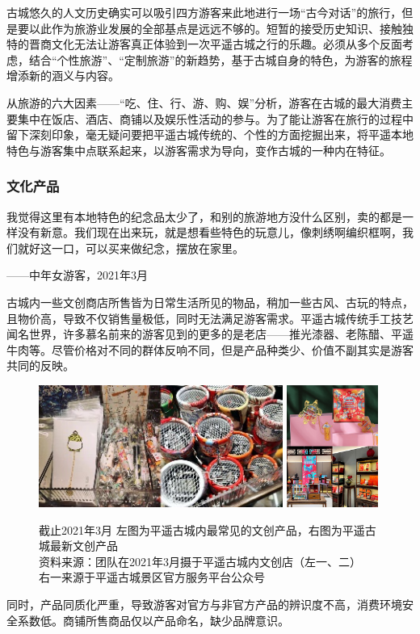 \documentclass[UTF8]{ctexart}
\begin{document}
        古城悠久的人文历史确实可以吸引四方游客来此地进行一场“古今对话”的旅行，但是要以此作为旅游业发展的全部基点是远远不够的。短暂的接受历史知识、接触独特的晋商文化无法让游客真正体验到一次平遥古城之行的乐趣。必须从多个反面考虑，结合“个性旅游”、“定制旅游”的新趋势，基于古城自身的特色，为游客的旅程增添新的涵义与内容。

        从旅游的六大因素——“吃、住、行、游、购、娱”分析，游客在古城的最大消费主要集中在饭店、酒店、商铺以及娱乐性活动的参与。为了能让游客在旅行的过程中留下深刻印象，毫无疑问要把平遥古城传统的、个性的方面挖掘出来，将平遥本地特色与游客集中点联系起来，以游客需求为导向，变作古城的一种内在特征。

        \subsubsection{文化产品}
        我觉得这里有本地特色的纪念品太少了，和别的旅游地方没什么区别，卖的都是一样没有新意。我们现在出来玩，就是想看些特色的玩意儿，像刺绣啊编织框啊，我们就好这一口，可以买来做纪念，摆放在家里。
        
        \begin{flushright}
            ——中年女游客，2021年3月
        \end{flushright}

        古城内一些文创商店所售皆为日常生活所见的物品，稍加一些古风、古玩的特点，且物价高，导致不仅销售量极低，同时无法满足游客需求。平遥古城传统手工技艺闻名世界，许多慕名前来的游客见到的更多的是老店——推光漆器、老陈醋、平遥牛肉等。尽管价格对不同的群体反响不同，但是产品种类少、价值不副其实是游客共同的反映。
    \begin{figure}[H]
        \centering
        \includegraphics[width=8cm]{文创1.jpeg}
        \includegraphics[width=3cm]{文创拼图.jpg}
        \caption[plain]{截止2021年3月 左图为平遥古城内最常见的文创产品，右图为平遥古城最新文创产品\\资料来源：团队在2021年3月摄于平遥古城内文创店（左一、二）\\右一来源于平遥古城景区官方服务平台公众号}
        \label{fig:my_label}
    \end{figure}
    同时，产品同质化严重，导致游客对官方与非官方产品的辨识度不高，消费环境安全系数低。商铺所售商品仅以产品命名，缺少品牌意识。
    \\\hspace{\fill}\\
    
\end{document}
